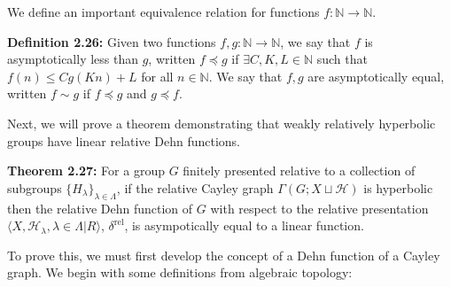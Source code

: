 \documentclass[12pt]{article}
\newcommand{\vs}{\vskip10pt}
\begin{document}
	\vs 
	
	We define an important equivalence relation for functions $f: \mathbb{N} \rightarrow \mathbb{N}$. 
	
	\vs 
	
	\textbf{Definition 2.26: } Given two functions $f,g: \mathbb{N} \rightarrow \mathbb{N}$, we say that $f$ is asymptotically less than $g$, written $f \preccurlyeq g$ if $\exists C,K,L \in \mathbb{N}$ such that $f(n) \leq Cg(Kn) + L$ for all $n \in \mathbb{N}$. We say that $f,g$ are asymptotically equal, written $f \sim g$ if $f \preccurlyeq g$ and $g \preccurlyeq f$.
	
	\vs 
	
	Next, we will prove a theorem demonstrating that weakly relatively hyperbolic groups have linear relative Dehn functions. 
	
	\vs 
	
	\textbf{Theorem 2.27: } For a group $G$ finitely presented relative to a collection of subgroups $\{H_{\lambda}\}_{\lambda \in \Lambda}$, if the relative Cayley graph $\Gamma(G; X \sqcup \mathcal{H})$ is hyperbolic then the relative Dehn function of $G$ with respect to the relative presentation $\langle X, \mathcal{H}_{\lambda}, \lambda \in \Lambda \vert R \rangle $, $\delta^{\text{rel}}$, is asympotically equal to a linear function. 
	
	\vs 
	
	To prove this, we must first develop the concept of a Dehn function of a Cayley graph. We begin with some definitions from algebraic topology: 
	
	\vs
	
\end{document}
